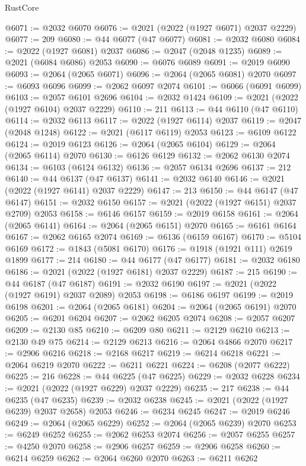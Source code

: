 \begin{lexlean}{RustCore}
\begin{coremodule}
@6071 := @2032 @6070
@6076 := @2021 (@2022 (@1927 @6071) @2037 @2229)
@6077 := 209
@6080 := @44 @6077 (@47 @6077)
@6081 := @2032 @6080
@6084 := @2022 (@1927 @6081) @2037
@6086 := @2047 (@2048 @1235)
@6089 := @2021 (@6084 @6086) @2053
@6090 := @6076 @6089
@6091 := @2019 @6090
@6093 := @2064 (@2065 @6071)
@6096 := @2064 (@2065 @6081) @2070
@6097 := @6093 @6096
@6099 := @2062 @6097 @2074
@6101 := @6066 (@6091 @6099)
@6103 := @2057 @6101 @2696
@6104 := @2032 @1424
@6109 := @2021 (@2022 (@1927 @6104) @2037 @2229)
@6110 := 211
@6113 := @44 @6110 (@47 @6110)
@6114 := @2032 @6113
@6117 := @2022 (@1927 @6114) @2037
@6119 := @2047 (@2048 @1248)
@6122 := @2021 (@6117 @6119) @2053
@6123 := @6109 @6122
@6124 := @2019 @6123
@6126 := @2064 (@2065 @6104)
@6129 := @2064 (@2065 @6114) @2070
@6130 := @6126 @6129
@6132 := @2062 @6130 @2074
@6134 := @6103 (@6124 @6132)
@6136 := @2057 @6134 @2696
@6137 := 212
@6140 := @44 @6137 (@47 @6137)
@6141 := @2032 @6140
@6146 := @2021 (@2022 (@1927 @6141) @2037 @2229)
@6147 := 213
@6150 := @44 @6147 (@47 @6147)
@6151 := @2032 @6150
@6157 := @2021 (@2022 (@1927 @6151) @2037 @2709) @2053
@6158 := @6146 @6157
@6159 := @2019 @6158
@6161 := @2064 (@2065 @6141)
@6164 := @2064 (@2065 @6151) @2070
@6165 := @6161 @6164
@6167 := @2062 @6165 @2074
@6169 := @6136 (@6159 @6167)
@6170 := @5104 @6169
@6172 := @1843 (@5081 @6170)
@6176 := @1918 (@1921 @111) @2619 @1899
@6177 := 214
@6180 := @44 @6177 (@47 @6177)
@6181 := @2032 @6180
@6186 := @2021 (@2022 (@1927 @6181) @2037 @2229)
@6187 := 215
@6190 := @44 @6187 (@47 @6187)
@6191 := @2032 @6190
@6197 := @2021 (@2022 (@1927 @6191) @2037 @2089) @2053
@6198 := @6186 @6197
@6199 := @2019 @6198
@6201 := @2064 (@2065 @6181)
@6204 := @2064 (@2065 @6191) @2070
@6205 := @6201 @6204
@6207 := @2062 @6205 @2074
@6208 := @2057 @6207
@6209 := @2130 @85
@6210 := @6209 @80
@6211 := @2129 @6210
@6213 := @2130 @49 @75
@6214 := @2129 @6213
@6216 := @2064 @4866 @2070
@6217 := @2906 @6216
@6218 := @2168 @6217
@6219 := @6214 @6218
@6221 := @2064 @6219 @2070
@6222 := @6211 @6221
@6224 := @6208 (@2077 @6222)
@6225 := 216
@6228 := @44 @6225 (@47 @6225)
@6229 := @2032 @6228
@6234 := @2021 (@2022 (@1927 @6229) @2037 @2229)
@6235 := 217
@6238 := @44 @6235 (@47 @6235)
@6239 := @2032 @6238
@6245 := @2021 (@2022 (@1927 @6239) @2037 @2658) @2053
@6246 := @6234 @6245
@6247 := @2019 @6246
@6249 := @2064 (@2065 @6229)
@6252 := @2064 (@2065 @6239) @2070
@6253 := @6249 @6252
@6255 := @2062 @6253 @2074
@6256 := @2057 @6255
@6257 := @4250 @2070
@6258 := @2906 @6257
@6259 := @2906 @6258
@6260 := @6214 @6259
@6262 := @2064 @6260 @2070
@6263 := @6211 @6262

\end{coremodule}
\end{lexlean}
